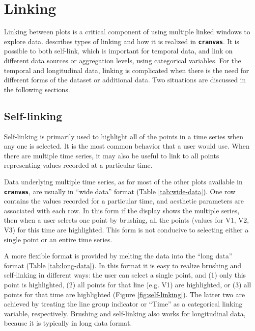 \documentclass[12pt]{article}
\begin{document}
\section{Linking\label{sec:Linking}}

Linking between plots is a critical component of using multiple linked
windows \citep{stuetzle1987plot} to explore data. \citet{xie2014reactive} describes
types of linking and how it is realized in \texttt{\textbf{cranvas}}.
It is possible to both self-link, which is important for temporal data,
and link on different data sources or aggregation levels, using
categorical variables. For the temporal and longitudinal data,
linking is complicated when there is the need for different forms of
the dataset or additional data. Two situations are discussed in
the following sections.

\subsection{Self-linking}

Self-linking is primarily used to highlight all of the points in a time series when any one is selected. It is the most common behavior that a user would use. When there are multiple time series, it may also be useful to link to all points representing values recorded at a particular time.

Data underlying multiple time series, as for most of the other
plots available in \texttt{\textbf{cranvas}}, are usually in
``wide data'' format (Table \ref{tab:wide-data}). One row contains
the values recorded for a particular time, and aesthetic
parameters are associated with each row. In this form if the
display shows the multiple series, then when a user selects
one point by brushing, all the points (values for V1, V2, V3)
for this time are highlighted. This form is not conducive to
selecting either a single point or an entire time series.


A more flexible format is provided by melting the data
into the ``long data'' format (Table \ref{tab:long-data}).
In this format it is easy to realize brushing and self-linking
in different ways: the user can select a single point, and
(1) only this point is highlighted, (2) all points for
that line (e.g. V1) are highlighted, or (3) all points
for that time are highlighted (Figure \ref{fig:self-linking}).
The latter two are achieved by treating the line group
indicator or ``Time'' as a categorical linking variable,
respectively. Brushing and self-linking also works for longitudinal data, because it is typically in long data format.
\end{document}
